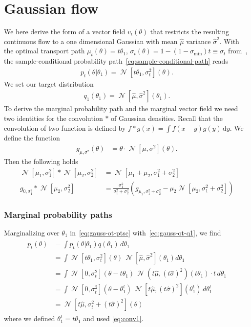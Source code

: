\documentclass{article}
\theoremstyle{remark}
\renewcommand{\d}{\mathrm{d}}
\DeclareMathOperator{\N}{\mathcal{N}}
\begin{document}
\section{Gaussian flow}
\label{sec:appendix-gaussian-flow}
We here derive the form of a vector field $v_t(\theta)$ that restricts the resulting continuous flow to a one dimensional Gaussian with mean $\hat\mu$ variance $\hat\sigma^2$. With the optimal transport path $\mu_t(\theta) = t\theta_1$, $\sigma_t(\theta) = 1 - (1 - \sigma_\text{min}) t \equiv\sigma_t$ from~\cite{flow_matching}, the sample-conditional probability path~\eqref{eq:sample-conditional-path} reads
\begin{align}\label{eq:gauss-ot-ptsc}
    p_t(\theta|\theta_1) = \N[t\theta_1,\sigma_t^2](\theta).
\end{align}
We set our target distribution
\begin{align}\label{eq:gauss-ot-q1}
    q_1(\theta_1) = \N[\hat\mu,\hat\sigma^2](\theta_1).
\end{align}
To derive the marginal probability path and the marginal vector field we need two identities for the convolution $\ast$ of Gaussian densities. Recall that the convolution of two function is defined by $f\ast g(x)=\int f(x-y)g(y)\,\d y$. We define the function
\begin{align}\label{eq:def_g}
     g_{\mu,\sigma^2}(\theta) & = \theta\cdot\N\left[\mu,\sigma^2\right](\theta).
\end{align}
Then the following holds
\begin{align}\label{eq:conv1}
    \N[\mu_1,\sigma_1^2]\ast \N[\mu_2,\sigma_2^2]&=
\N[\mu_1+\mu_2,\sigma_1^2+\sigma_2^2]\\
\label{eq:conv2}
    g_{0,\sigma_1^2}\ast \N[\mu_2,\sigma_2^2]
    &=
    \frac{\sigma_1^2}{\sigma_1^2+\sigma_2^2}\left(g_{\mu_2,\sigma_1^2+\sigma_2^2}-\mu_2\N[\mu_2,\sigma_1^2+\sigma_2^2]\right)
\end{align}
\subsubsection*{Marginal probability paths}
Marginalizing over $\theta_1$ in~\eqref{eq:gauss-ot-ptsc} with~\eqref{eq:gauss-ot-q1}, we find
\begin{align}\label{eq:gauss-ot-pt}
    \begin{split}
        p_t(\theta) 
        & = \int p_t(\theta|\theta_1) q(\theta_1)\, d\theta_1\\
        & = \int \N\left[t\theta_1, \sigma_t^2\right](\theta)\,\N\left[\hat\mu,\hat\sigma^2\right](\theta_1) d\theta_1\\
        & = \int \N\left[0, \sigma_t^2\right](\theta - t\theta_1)\, \N(t\hat\mu,(t\hat\sigma)^2)(t\theta_1)\cdot t\, d\theta_1\\
        & = \int \N\left[0, \sigma_t^2\right](\theta - \theta^t_1)\, \N\left[t\hat\mu,(t\hat\sigma)^2\right](\theta^t_1)\, d\theta^t_1\\
        & = \N\left[t\hat\mu, \sigma_t^2 + (t\hat\sigma)^2\right](\theta)
    \end{split}
\end{align}
where we defined $\theta_1^t = t\theta_1$ and used \eqref{eq:conv1}. 
\end{document}
